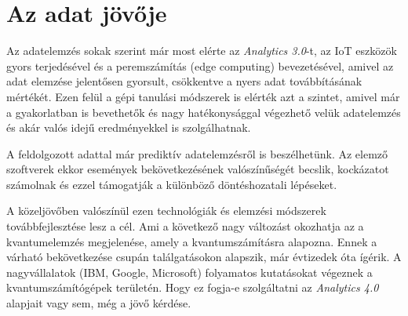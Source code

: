 \section{Az adat jövője}

Az adatelemzés sokak szerint már most elérte az \textit{Analytics 3.0}-t, az IoT eszközök gyors terjedésével és a peremszámítás (edge computing) bevezetésével, amivel az adat elemzése jelentősen gyorsult, csökkentve a nyers adat továbbításának mértékét. Ezen felül a gépi tanulási módszerek is elérték azt a szintet, amivel már a gyakorlatban is bevethetők és nagy hatékonysággal végezhető velük adatelemzés és akár valós idejű eredményekkel is szolgálhatnak.

A feldolgozott adattal már prediktív adatelemzésről is beszélhetünk. Az elemző szoftverek ekkor események bekövetkezésének valószínűségét becslik, kockázatot számolnak és ezzel támogatják a különböző döntéshozatali lépéseket.

A közeljövőben valószínül ezen technológiák és elemzési módszerek továbbfejlesztése lesz a cél. Ami a következő nagy változást okozhatja az a kvantumelemzés megjelenése, amely a kvantumszámításra alapozna. Ennek a várható bekövetkezése csupán találgatásokon alapszik, már évtizedek óta ígérik. A nagyvállalatok (IBM, Google, Microsoft) folyamatos kutatásokat végeznek a kvantumszámítógépek területén. Hogy ez fogja-e szolgáltatni az \textit{Analytics 4.0} alapjait vagy sem, még a jövő kérdése.